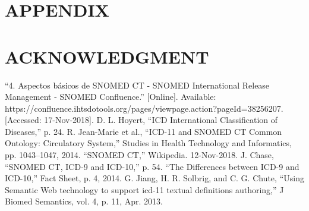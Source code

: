 \documentclass[letterpaper, 10 pt, conference]{ieeeconf}  %
\begin{document}






\section*{APPENDIX}



\section*{ACKNOWLEDGMENT}










\begin{thebibliography}{99}

 “4. Aspectos básicos de SNOMED CT - SNOMED International Release Management - SNOMED Confluence.” [Online]. Available: https://confluence.ihtsdotools.org/pages/viewpage.action?pageId=38256207. [Accessed: 17-Nov-2018].
 D. L. Hoyert, “ICD International Classification of Diseases,” p. 24.
 R. Jean-Marie et al., “ICD-11 and SNOMED CT Common Ontology: Circulatory System,” Studies in Health Technology and Informatics, pp. 1043–1047, 2014.
 “SNOMED CT,” Wikipedia. 12-Nov-2018.
 J. Chase, “SNOMED CT, ICD-9 and ICD-10,” p. 54.
 “The Differences between ICD-9 and ICD-10,” Fact Sheet, p. 4, 2014.
 G. Jiang, H. R. Solbrig, and C. G. Chute, “Using Semantic Web technology to support icd-11 textual definitions authoring,” J Biomed Semantics, vol. 4, p. 11, Apr. 2013.



\end{thebibliography}
\end{document}
